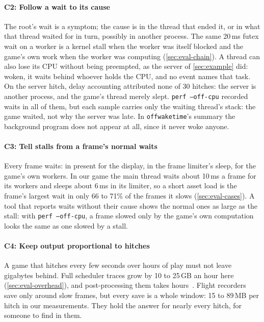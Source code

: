 \paragraph{C2: Follow a wait to its cause} The root's wait is a symptom; the
cause is in the thread that ended it, or in what that thread waited for in
turn, possibly in another process. The same 20\,ms futex wait on a worker
is a kernel stall when the worker was itself blocked and the game's own
work when the worker was computing (\autoref{sec:eval-chain}). A thread can
also lose its CPU without being preempted, as the server of
\autoref{sec:example} did: woken, it waits behind whoever holds the CPU,
and no event names that task. On the server hitch, delay accounting
attributed none of 30 hitches: the server is another process, and the
game's thread merely slept. \texttt{perf --off-cpu} recorded waits in all
of them, but each sample carries only the waiting thread's stack: the game
waited, not why the server was late. In \texttt{offwaketime}'s summary the
background program does not appear at all, since it never woke anyone.

\paragraph{C3: Tell stalls from a frame's normal waits} Every frame waits: in
present for the display, in the frame limiter's sleep, for the game's own
workers. In our game the main thread waits about 10\,ms a frame for its
workers and sleeps about 6\,ms in its limiter, so a short asset load is the
frame's largest wait in only 66 to 71\% of the frames it slows
(\autoref{sec:eval-cases}). A tool that reports waits without their cause
shows the normal ones as large as the stall: with \texttt{perf --off-cpu},
a frame slowed only by the game's own computation looks the same as one
slowed by a stall.

\paragraph{C4: Keep output proportional to hitches} A game that hitches every
few seconds over hours of play must not leave gigabytes behind. Full
scheduler traces grow by 10 to 25\,GB an hour here
(\autoref{sec:eval-overhead}), and post-processing them takes
hours~\cite{vapormark}. Flight recorders save only around slow frames, but
every save is a whole window: 15 to 89\,MB per hitch in our measurements.
They hold the answer for nearly every hitch, for someone to find in them.

